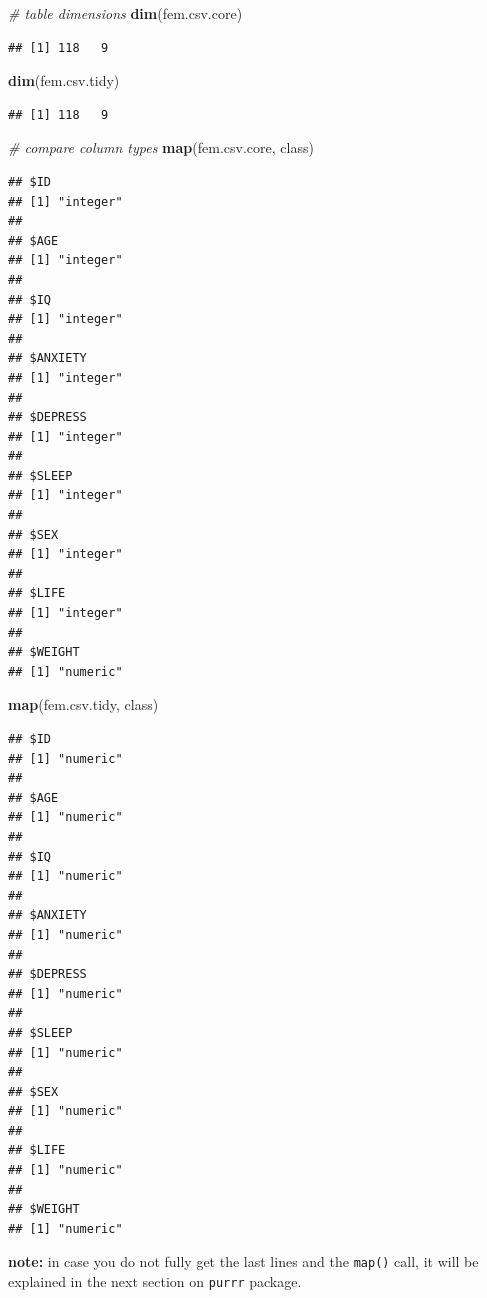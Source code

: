 \documentclass[
]{book}
\newenvironment{Shaded}{\begin{snugshade}}{\end{snugshade}}
\newcommand{\CommentTok}[1]{\textcolor[rgb]{0.56,0.35,0.01}{\textit{#1}}}
\newcommand{\FunctionTok}[1]{\textcolor[rgb]{0.13,0.29,0.53}{\textbf{#1}}}
\newcommand{\NormalTok}[1]{#1}
\begin{document}
\begin{Shaded}
\begin{Highlighting}[]
\CommentTok{\# table dimensions}
\FunctionTok{dim}\NormalTok{(fem.csv.core)}
\end{Highlighting}
\end{Shaded}

\begin{verbatim}
## [1] 118   9
\end{verbatim}

\begin{Shaded}
\begin{Highlighting}[]
\FunctionTok{dim}\NormalTok{(fem.csv.tidy)}
\end{Highlighting}
\end{Shaded}

\begin{verbatim}
## [1] 118   9
\end{verbatim}

\begin{Shaded}
\begin{Highlighting}[]
\CommentTok{\# compare column types}
\FunctionTok{map}\NormalTok{(fem.csv.core, class)}
\end{Highlighting}
\end{Shaded}

\begin{verbatim}
## $ID
## [1] "integer"
## 
## $AGE
## [1] "integer"
## 
## $IQ
## [1] "integer"
## 
## $ANXIETY
## [1] "integer"
## 
## $DEPRESS
## [1] "integer"
## 
## $SLEEP
## [1] "integer"
## 
## $SEX
## [1] "integer"
## 
## $LIFE
## [1] "integer"
## 
## $WEIGHT
## [1] "numeric"
\end{verbatim}

\begin{Shaded}
\begin{Highlighting}[]
\FunctionTok{map}\NormalTok{(fem.csv.tidy, class)}
\end{Highlighting}
\end{Shaded}

\begin{verbatim}
## $ID
## [1] "numeric"
## 
## $AGE
## [1] "numeric"
## 
## $IQ
## [1] "numeric"
## 
## $ANXIETY
## [1] "numeric"
## 
## $DEPRESS
## [1] "numeric"
## 
## $SLEEP
## [1] "numeric"
## 
## $SEX
## [1] "numeric"
## 
## $LIFE
## [1] "numeric"
## 
## $WEIGHT
## [1] "numeric"
\end{verbatim}

\textbf{note:} in case you do not fully get the last lines and the \texttt{map()} call, it will be explained in the next section on \texttt{purrr} package.
\end{document}

